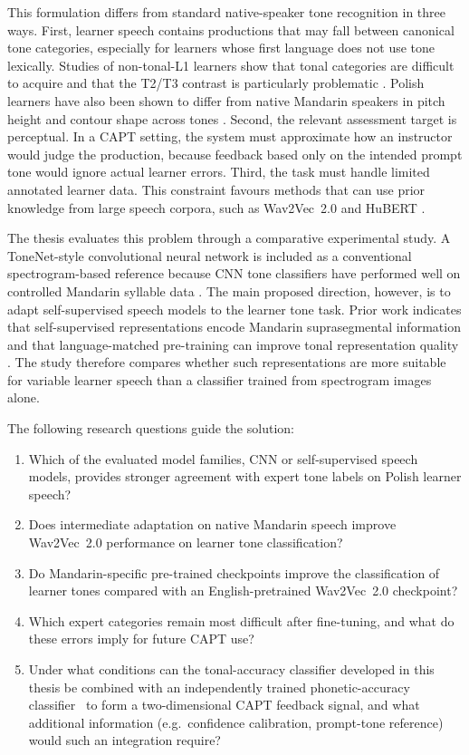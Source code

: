 This formulation differs from standard native-speaker tone recognition in three
ways. First, learner speech contains productions that may fall between canonical
tone categories, especially for learners whose first language does not use tone
lexically. Studies of non-tonal-L1 learners show that tonal categories are
difficult to acquire and that the T2/T3 contrast is particularly problematic
\cite{hao2012}. Polish learners have also been shown to differ from native
Mandarin speakers in pitch height and contour shape across tones
\cite{chu2024statistical,zajdler2021}. Second, the relevant assessment target is
perceptual. In a CAPT setting, the system must approximate how an instructor
would judge the production, because feedback based only on the intended prompt
tone would ignore actual learner errors. Third, the task must handle limited
annotated learner data. This constraint favours methods that can use prior
knowledge from large speech corpora, such as Wav2Vec~2.0 and HuBERT
\cite{baevski2020,hsu2021}.

The thesis evaluates this problem through a comparative experimental study. A
ToneNet-style convolutional neural network is included as a conventional
spectrogram-based reference because CNN tone classifiers have performed well on
controlled Mandarin syllable data \cite{gao2019tonenet}. The main proposed
direction, however, is to adapt self-supervised speech models to the learner
tone task. Prior work indicates that self-supervised representations encode
Mandarin suprasegmental information and that language-matched pre-training can
improve tonal representation quality \cite{yuan2023,delafuente2024}. The study
therefore compares whether such representations are more suitable for variable
learner speech than a classifier trained from spectrogram images alone.

The following research questions guide the solution:

\begin{enumerate}[label=\textbf{RQ\arabic*.}, leftmargin=1.5cm]
  \item Which of the evaluated model families, CNN or self-supervised speech
  models, provides stronger agreement with expert tone labels on Polish learner
  speech?
  \item Does intermediate adaptation on native Mandarin speech improve
  Wav2Vec~2.0 performance on learner tone classification?
  \item Do Mandarin-specific pre-trained checkpoints improve the classification
  of learner tones compared with an English-pretrained Wav2Vec~2.0 checkpoint?
  \item Which expert categories remain most difficult after fine-tuning, and what do
  these errors imply for future CAPT use?
  \item Under what conditions can the tonal-accuracy classifier developed in
  this thesis be combined with an independently trained phonetic-accuracy
  classifier~\cite{brzeski2025mprp} to form a two-dimensional CAPT feedback
  signal, and what additional information (e.g.\ confidence calibration,
  prompt-tone reference) would such an integration require?
\end{enumerate}

